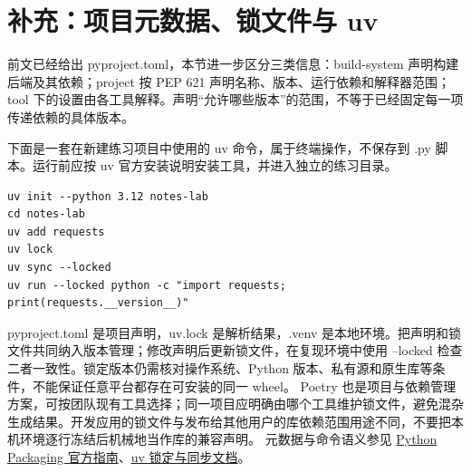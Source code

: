 \section{补充：项目元数据、锁文件与 uv}\label{rev:python:packaging}
前文已经给出 pyproject.toml，本节进一步区分三类信息：build-system 声明构建后端及其依赖；project 按 PEP 621 声明名称、版本、运行依赖和解释器范围；tool 下的设置由各工具解释。声明“允许哪些版本”的范围，不等于已经固定每一项传递依赖的具体版本。

下面是一套在新建练习项目中使用的 uv 命令，属于终端操作，不保存到 .py 脚本。运行前应按 uv 官方安装说明安装工具，并进入独立的练习目录。
\begin{lstlisting}[language={},title={终端：创建与同步练习项目}]
uv init --python 3.12 notes-lab
cd notes-lab
uv add requests
uv lock
uv sync --locked
uv run --locked python -c "import requests; print(requests.__version__)"
\end{lstlisting}
pyproject.toml 是项目声明，uv.lock 是解析结果，.venv 是本地环境。把声明和锁文件共同纳入版本管理；修改声明后更新锁文件，在复现环境中使用 --locked 检查二者一致性。锁定版本仍需核对操作系统、Python 版本、私有源和原生库等条件，不能保证任意平台都存在可安装的同一 wheel。
Poetry 也是项目与依赖管理方案，可按团队现有工具选择；同一项目应明确由哪个工具维护锁文件，避免混杂生成结果。开发应用的锁文件与发布给其他用户的库依赖范围用途不同，不要把本机环境逐行冻结后机械地当作库的兼容声明。
元数据与命令语义参见 \href{https://packaging.python.org/en/latest/guides/writing-pyproject-toml/}{Python Packaging 官方指南}、\href{https://docs.astral.sh/uv/concepts/projects/sync/}{uv 锁定与同步文档}。
